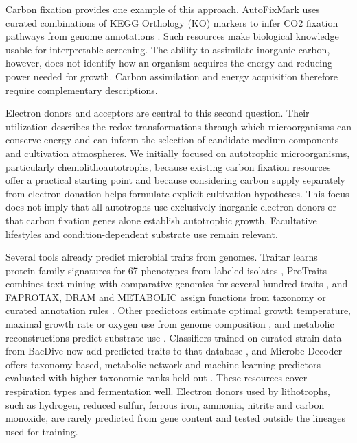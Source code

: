 \documentclass[10pt,a4paper,onecolumn]{article}
\begin{document}
Carbon fixation provides one example of this approach. AutoFixMark uses
curated combinations of KEGG Orthology (KO) markers to infer CO2
fixation pathways from genome annotations \autocite{Kawashima2026}. Such
resources make biological knowledge usable for interpretable screening.
The ability to assimilate inorganic carbon, however, does not identify
how an organism acquires the energy and reducing power needed for
growth. Carbon assimilation and energy acquisition therefore require
complementary descriptions.

Electron donors and acceptors are central to this second question. Their
utilization describes the redox transformations through which
microorganisms can conserve energy and can inform the selection of
candidate medium components and cultivation atmospheres. We initially
focused on autotrophic microorganisms, particularly
chemolithoautotrophs, because existing carbon fixation resources offer a
practical starting point and because considering carbon supply
separately from electron donation helps formulate explicit cultivation
hypotheses. This focus does not imply that all autotrophs use
exclusively inorganic electron donors or that carbon fixation genes
alone establish autotrophic growth. Facultative lifestyles and
condition-dependent substrate use remain relevant.

Several tools already predict microbial traits from genomes. Traitar
learns protein-family signatures for 67 phenotypes from labeled isolates
\autocite{Weimann2016}, ProTraits combines text mining with comparative
genomics for several hundred traits \autocite{Brbic2016}, and FAPROTAX,
DRAM and METABOLIC assign functions from taxonomy or curated annotation
rules \autocite{Louca2016,Shaffer2020,Zhou2022}. Other predictors
estimate optimal growth temperature, maximal growth rate or oxygen use
from genome composition \autocite{Sauer2019,Weissman2021,Flamholz2024},
and metabolic reconstructions predict substrate use
\autocite{Zimmermann2021}. Classifiers trained on curated strain data
from BacDive now add predicted traits to that database
\autocite{Koblitz2025}, and Microbe Decoder offers taxonomy-based,
metabolic-network and machine-learning predictors evaluated with higher
taxonomic ranks held out \autocite{Hackmann2026}. These resources cover
respiration types and fermentation well. Electron donors used by
lithotrophs, such as hydrogen, reduced sulfur, ferrous iron, ammonia,
nitrite and carbon monoxide, are rarely predicted from gene content and
tested outside the lineages used for training.
\end{document}
